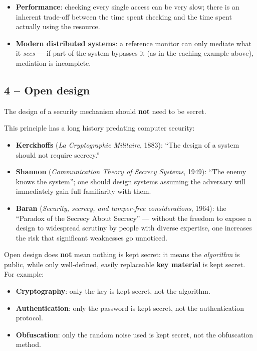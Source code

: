 \begin{remark}
\begin{itemize}
    \item \textbf{Performance}: checking every single access can be very slow; there is an inherent trade-off between the time spent checking and the time spent actually using the resource.
    \item \textbf{Modern distributed systems}: a reference monitor can only mediate what it \emph{sees} --- if part of the system bypasses it (as in the caching example above), mediation is incomplete.
\end{itemize}
\end{remark}

\subsection{4 -- Open design}

\begin{definition}
The design of a security mechanism should \textbf{not} need to be secret.
\end{definition}

This principle has a long history predating computer security:
\begin{itemize}
    \item \textbf{Kerckhoffs} (\emph{La Cryptographie Militaire}, 1883): ``The design of a system should not require secrecy.''
    \item \textbf{Shannon} (\emph{Communication Theory of Secrecy Systems}, 1949): ``The enemy knows the system''; one should design systems assuming the adversary will immediately gain full familiarity with them.
    \item \textbf{Baran} (\emph{Security, secrecy, and tamper-free considerations}, 1964): the ``Paradox of the Secrecy About Secrecy'' --- without the freedom to expose a design to widespread scrutiny by people with diverse expertise, one increases the risk that significant weaknesses go unnoticed.
\end{itemize}

\begin{remark}
Open design does \textbf{not} mean nothing is kept secret: it means the \emph{algorithm} is public, while only well-defined, easily replaceable \textbf{key material} is kept secret. For example:
\begin{itemize}
    \item \textbf{Cryptography}: only the key is kept secret, not the algorithm.
    \item \textbf{Authentication}: only the password is kept secret, not the authentication protocol.
    \item \textbf{Obfuscation}: only the random noise used is kept secret, not the obfuscation method.
\end{itemize}
\end{remark}

